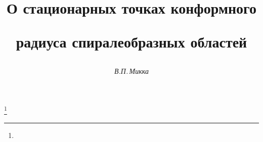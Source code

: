 









\newcommand{\const}{\operatorname{const}}


\newcommand{\re}{\operatorname{Re}}


\newcommand{\im}{\operatorname{Im}}


\newcommand{\arctg}{\operatorname{arctg}}


\newcommand{\tts}[1]{}









\setcounter{page}{38}















\author{\it В.П.\,Микка}




\title{О стационарных точках конформного 


радиуса спиралеобразных областей}


\thanks{}





\date{}




\pagestyle{plain} %







